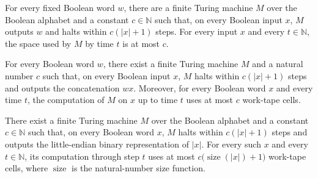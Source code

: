 \begin{theorem}
\label{Turing.FinTM.computesFunInTime_const_spaceUsed}
\leanok
{}
For every fixed Boolean word $w$, there are a finite Turing machine $M$ over the Boolean
alphabet and a constant $c\in\mathbb{N}$ such that, on every Boolean input $x$, $M$
outputs $w$ and halts within $c(|x|+1)$ steps. For every input $x$ and every
$t\in\mathbb{N}$, the space used by $M$ by time $t$ is at most $c$.
\end{theorem}

\begin{theorem}
\label{Turing.FinTM.computesFunInTime_prepend_spaceUsed}
\leanok
{}
For every Boolean word $w$, there exist a finite Turing machine $M$ and a natural number
$c$ such that, on every Boolean input $x$, $M$ halts within $c(|x|+1)$ steps and outputs
the concatenation $w x$. Moreover, for every Boolean word $x$ and every time $t$, the
computation of $M$ on $x$ up to time $t$ uses at most $c$ work-tape cells.
\end{theorem}

\begin{theorem}
\label{Turing.FinTM.computesFunInTime_lengthBits_spaceUsed}
\leanok
{}
There exist a finite Turing machine $M$ over the Boolean alphabet and a constant
$c\in\mathbb{N}$ such that, on every Boolean word $x$, $M$ halts within $c(|x|+1)$ steps
and outputs the little-endian binary representation of $|x|$. For every such $x$ and
every $t\in\mathbb{N}$, its computation through step $t$ uses at most
$c\bigl(\operatorname{size}(|x|)+1\bigr)$ work-tape cells, where $\operatorname{size}$
is the natural-number size function.
\end{theorem}


